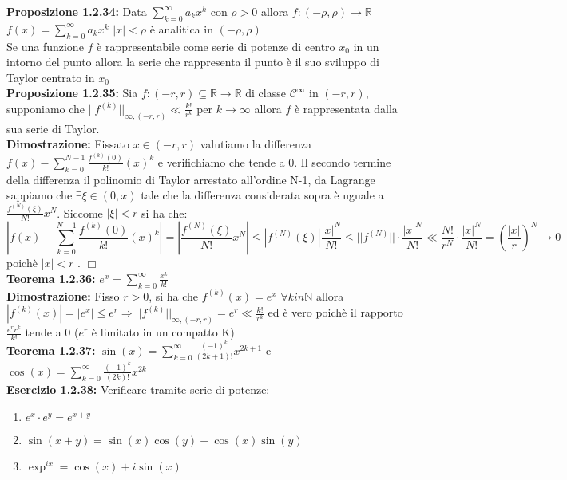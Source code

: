 \documentclass[a4paper,11pt,titlepage]{book}
\begin{document}
\textbf{Proposizione 1.2.34:} Data $\sum_{k=0}^\infty a_k x^k$ con $\rho>0$ allora $f:(-\rho,\rho)\to\mathbb{R}$ $f(x)=\sum_{k=0}^\infty a_k x^k$ $|x|<\rho$ è analitica in $(-\rho,\rho)$\\

Se una funzione $f$ è rappresentabile come serie di potenze di centro $x_0$ in un intorno del punto allora la serie che rappresenta il punto è il suo sviluppo di Taylor centrato in $x_0$\\

\textbf{Proposizione 1.2.35:} Sia $f:(-r,r)\subseteq\mathbb{R}\to\mathbb{R}$ di classe $\mathcal{C}^\infty$ in $(-r,r)$, supponiamo che $||f^{(k)}||_{\infty,(-r,r)}\ll\frac{k!}{r^k}$ per $k\to\infty$ allora $f$ è rappresentata dalla sua serie di Taylor.\\

\textbf{Dimostrazione:} Fissato $x\in (-r,r)$ valutiamo la differenza $f(x)-\sum_{k=0}^{N-1} \frac{f^{(k)}(0)}{k!}(x)^k$ e verifichiamo che tende a 0. Il secondo termine della differenza il polinomio di Taylor arrestato all'ordine N-1, da Lagrange sappiamo che $\exists\xi\in(0,x)$ tale che la differenza considerata sopra è uguale a $\frac{f^{(N)}(\xi)}{N!}x^N$. Siccome $|\xi|<r$ si ha che: $$|f(x)-\sum_{k=0}^{N-1} \frac{f^{(k)}(0)}{k!}(x)^k|=|\frac{f^{(N)}(\xi)}{N!}x^N|\leq|f^{(N)}(\xi)|\frac{|x|^N}{N!}\leq||f^{(N)}||\cdot\frac{|x|^N}{N!}\ll\frac{N!}{r^N}\cdot\frac{|x|^N}{N!}=\left(\frac{|x|}{r}\right)^N\to 0$$ poichè $|x|<r$ . $\Box$\\

\textbf{Teorema 1.2.36:} $e^x=\sum_{k=0}^\infty \frac{x^k}{k!}$\\

\textbf{Dimostrazione:} Fisso $r>0$, si ha che $f^{(k)}(x)=e^x$ $\forall k in \mathbb{N}$ allora $|f^{(k)}(x)|=|e^x|\leq e^r \Rightarrow ||f^{(k)}||_{\infty,(-r,r)}=e^r\ll\frac{k!}{r^k}$ ed è vero poichè il rapporto $\frac{e^r r^k}{k!}$ tende a 0 ($e^r$ è limitato in un compatto K)  \fbox{\phantom{3}}\\

\textbf{Teorema 1.2.37:} $\sin(x)=\sum_{k=0}^\infty \frac{(-1)^k}{(2k+1)!}x^{2k+1}$ e $\cos(x)=\sum_{k=0}^\infty \frac{(-1)^k}{(2k)!}x^{2k}$\\

\textbf{Esercizio 1.2.38:} Verificare tramite serie di potenze:\begin{enumerate}
\item $e^x\cdot e^y=e^{x+y}$
\item $\sin(x+y)=\sin(x)\cos(y)-\cos(x)\sin(y)$
\item $\exp^{ix}=\cos(x)+i\sin(x)$
\end{enumerate}
\end{document}
